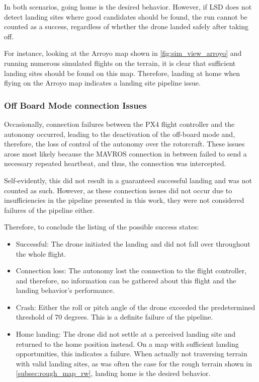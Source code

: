     In both scenarios, going home is the desired behavior. However, if LSD does not detect landing sites where good candidates should be found, the run cannot be counted as a success, regardless of whether the drone landed safely after taking off.

    For instance, looking at the Arroyo map shown in \cref{fig:sim_view_arroyo} and running numerous simulated flights on the terrain, it is clear that sufficient landing sites should be found on this map. Therefore, landing at home when flying on the Arroyo map indicates a landing site pipeline issue.
\subsubsection{Off Board Mode connection Issues}
Occasionally, connection failures between the PX4 flight controller and the autonomy occurred, leading to the deactivation of the off-board mode and, therefore, the loss of control of the autonomy over the rotorcraft. These issues arose most likely because the MAVROS connection in between failed to send a necessary repeated heartbeat, and thus, the connection was intercepted.

Self-evidently, this did not result in a guaranteed successful landing and was not counted as such. However, as these connection issues did not occur due to insufficiencies in the pipeline presented in this work, they were not considered failures of the pipeline either. 

Therefore, to conclude the listing of the possible success states:

\begin{itemize}
    \item Successful: The drone initiated the landing and did not fall over throughout the whole flight.
    \item Connection loss: The autonomy lost the connection to the flight controller, and therefore, no information can be gathered about this flight and the landing behavior's performance.
    \item Crash: Either the roll or pitch angle of the drone exceeded the predetermined threshold of 70 degrees. This is a definite failure of the pipeline.
    \item Home landing: The drone did not settle at a perceived landing site and returned to the home position instead. On a map with sufficient landing opportunities, this indicates a failure. When actually not traversing terrain with valid landing sites, as was often the case for the rough terrain shown in \cref{subsec:rough_map_rw}, landing home is the desired behavior.
\end{itemize}
\clearpage


